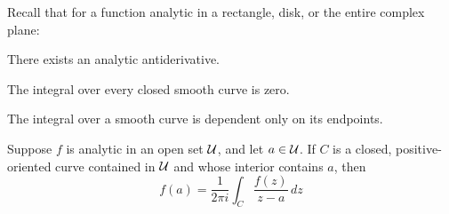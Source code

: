 \documentclass[10pt]{article}
\def\mU{{\cal U}}
\begin{document}


\bigskip

Recall that for a function analytic in a rectangle, disk, or the entire complex plane:
\benum
    \item There exists an analytic antiderivative.
    \item The integral over every closed smooth curve is zero.
    \item The integral over a smooth curve is dependent only on its endpoints.
\eenum

\begin{thrm*}

    Suppose $f$ is analytic in an open set $\mU$, and let $a\in\mU$.
    If $C$ is a closed, positive-oriented curve contained in $\mU$ and whose interior contains $a$, then
    \[ f(a) = \frac1{2\pi i}\int_C\frac{f(z)}{z-a}\,dz \]

\end{thrm*}
\end{document}
